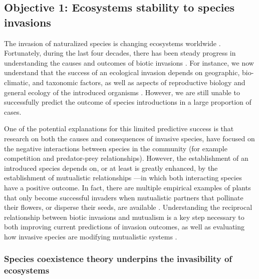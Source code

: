 \documentclass[a4paper]{article}
\begin{document}
\subsection*{Objective 1: Ecosystems stability to species invasions}

The invasion of naturalized species is changing ecosystems worldwide \autocite{Loevei1997, Ehrenfeld2010}.
Fortunately, during the last four decades, there has been steady progress in understanding the causes and outcomes of biotic invasions \autocite{Romanuk2009, Powell2011}.
For instance, we now understand that the success of an ecological invasion depends on geographic, bio-climatic, and taxonomic factors, as well as aspects of reproductive biology and general ecology of the introduced organisms \autocite{Simberloff1999, Richardson2000, Strayer2012, Thomsen2014, Galiana2014}.
However, we are still unable to successfully predict the outcome of species introductions in a large proportion of cases.

One of the potential explanations for this limited predictive success is that research on both the causes and consequences of invasive species, have focused on the negative interactions between species in the community (for example competition and predator-prey relationships).
However, the establishment of an introduced species depends on, or at least is greatly enhanced, by the establishment of  mutualistic relationships \autocite{Richardson2000}---in which both interacting species have a positive outcome.
In fact, there are multiple empirical examples of plants that only become successful invaders when mutualistic partners that pollinate their flowers, or disperse their seeds, are available \autocite{Simberloff1999, Simberloff2006, Prior2014}.
Understanding the reciprocal relationship between biotic invasions and mutualism is a key step necessary to both improving current predictions of invasion outcomes, as well as evaluating how invasive species are modifying mutualistic systems \autocite{Richardson2000}.

\subsubsection*{Species coexistence theory underpins the invasibility of ecosystems}
\end{document}
